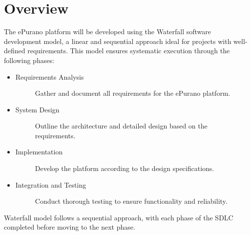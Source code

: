 \section{Overview}

The ePurano platform will be developed using the Waterfall software development model, a linear and sequential approach ideal for projects with well-defined requirements. This model ensures systematic execution through the following phases:

\begin{itemize}
    
    \item \begin{description}
        \item[Requirements Analysis] Gather and document all requirements for the ePurano platform.
    \end{description}
    \item \begin{description}
        \item[System Design] Outline the architecture and detailed design based on the requirements.
    \end{description}
    \item \begin{description}
        \item[Implementation] Develop the platform according to the design specifications.
    \end{description}
    \item \begin{description}
        \item[Integration and Testing] Conduct thorough testing to ensure functionality and reliability.
    \end{description}
\end{itemize}

Waterfall model follows a sequential approach, with each phase of the SDLC completed before moving to the next phase.